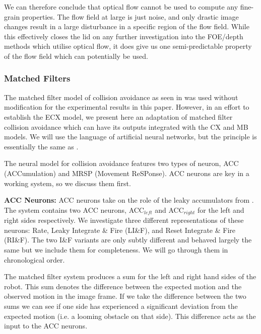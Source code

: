\documentclass[a4paper,11pt,twoside,openright]{article}
\begin{document}
We can therefore conclude that optical flow cannot be used to compute
any fine-grain properties. The flow field at large is just noise, and
only drastic image changes result in a large disturbance in a specific
region of the flow field. While this effectively closes the lid on any
further investigation into the FOE/depth methods which utilise optical
flow, it does give us one semi-predictable property of the flow field
which can potentially be used.

\subsubsection{Matched Filters}
The matched filter model of collision avoidance as seen in
\cite{Mitchell2018} was used without modification for the experimental
results in this paper.  However, in an effort to establish the ECX
model, we present here an adaptation of matched filter collision
avoidance which can have its outputs integrated with the CX and MB
models. We will use the language of artificial neural networks, but
the principle is essentially the same as \cite{Mitchell2018}.
\newline\par

The neural model for collision avoidance features two types of neuron, ACC
(ACCumulation) and MRSP (Movement ReSPonse). ACC neurons are key in a working
system, so we discuss them first.
\newline\par

\textbf{ACC Neurons:}
ACC neurons take on the role of the leaky accumulators from \cite{Mitchell2018,
  Stewart2010}. The system contains two ACC neurons, ACC$_{left}$ and
ACC$_{right}$ for the left and right sides respectively. We investigate three
different representations of these neurons: Rate, Leaky Integrate \& Fire
(LI\&F), and Reset Integrate \& Fire (RI\&F). The two I\&F variants are only
subtly different and behaved largely the same but we include them for
completeness. We will go through them in chronological order.
\newline\par

The matched filter system produces a sum for the left and right hand sides of the
robot. This sum denotes the difference between the expected motion and the
observed motion in the image frame. If we take the difference between the two
sums we can see if one side has experienced a significant deviation from the
expected motion (i.e. a looming obstacle on that side). This difference acts
as the input to the ACC neurons.
\newline\par
\end{document}
